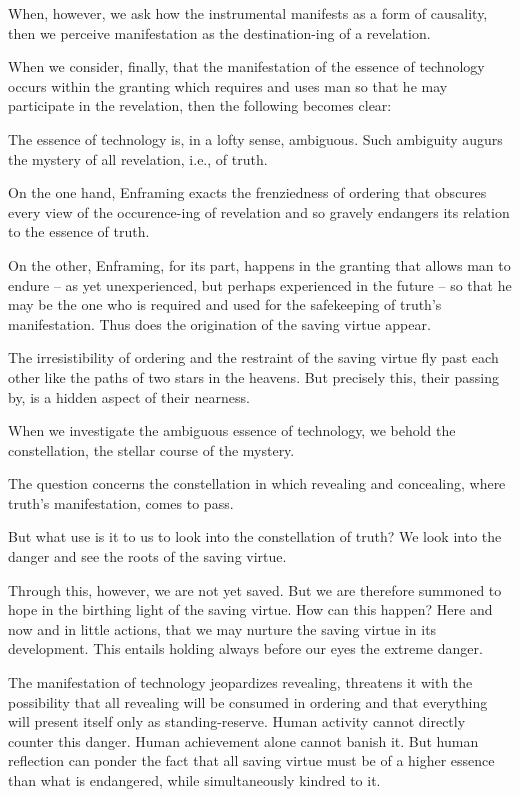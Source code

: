 \documentclass[12pt]{article}
\begin{document}
When, however, we ask how the instrumental manifests as a form of causality, then we perceive manifestation as the destination-ing of a revelation.

When we consider, finally, that the manifestation of the essence of technology occurs within the granting which requires and uses man so that he may participate in the revelation, then the following becomes clear:

The essence of technology is, in a lofty sense, ambiguous. Such ambiguity augurs the mystery of all revelation, i.e., of truth.

On the one hand, Enframing exacts the frenziedness of ordering that obscures every view of the occurence-ing of revelation and so gravely endangers its relation to the essence of truth.

On the other, Enframing, for its part, happens in the granting that allows man to endure -- as yet unexperienced, but perhaps experienced in the future -- so that he may be the one who is required and used for the safekeeping of truth's manifestation. Thus does the origination of the saving virtue appear.

The irresistibility of ordering and the restraint of the saving virtue fly past each other like the paths of two stars in the heavens. But precisely this, their passing by, is a hidden aspect of their nearness.

When we investigate the ambiguous essence of technology, we behold the constellation, the stellar course of the mystery.

The question concerns the constellation in which revealing and concealing, where truth's manifestation, comes to pass.

But what use is it to us to look into the constellation of truth? We look into the danger and see the roots of the saving virtue.

Through this, however, we are not yet saved. But we are therefore summoned to hope in the birthing light of the saving virtue. How can this happen? Here and now and in little actions, that we may nurture the saving virtue in its development. This entails holding always before our eyes the extreme danger.

The manifestation of technology jeopardizes revealing, threatens it with the possibility that all revealing will be consumed in ordering and that everything will present itself only as standing-reserve. Human activity cannot directly counter this danger. Human achievement alone cannot banish it. But human reflection can ponder the fact that all saving virtue must be of a higher essence than what is endangered, while simultaneously kindred to it.
\end{document}

